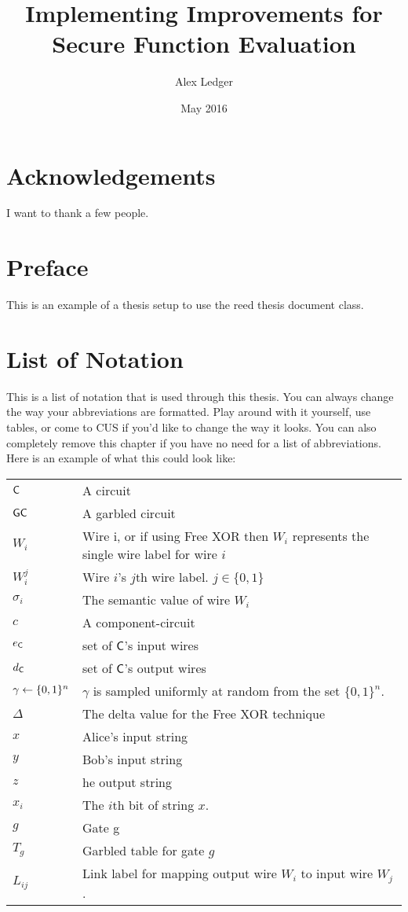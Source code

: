 \documentclass[12pt,twoside]{reedthesis}
\title{Implementing Improvements for Secure Function Evaluation}
\author{Alex Ledger}
\date{May 2016}
\begin{document}
\maketitle
\frontmatter %
\pagestyle{empty} %


\chapter*{Acknowledgements}
I want to thank a few people.

\chapter*{Preface}
This is an example of a thesis setup to use the reed thesis document class.

\chapter*{List of Notation}
This is a list of notation that is used through this thesis.
You can always change the way your abbreviations are formatted. Play around with it yourself, use tables, or come to CUS if you'd like to change the way it looks. You can also completely remove this chapter if you have no need for a list of abbreviations. Here is an example of what this could look like:

\begin{table}[h]
\centering %
\begin{tabular}{ll}
    $\sf {C}$ & A circuit \\
    $\sf {GC}$ & A garbled circuit \\
    $W_i$ & Wire i, or if using Free XOR then $W_i$ represents the single wire label for wire $i$ \\
    $W_i^j$ & Wire $i$'s $j$th wire label. $j \in \{0,1\}$ \\
    $\sigma_i$ & The semantic value of wire $W_i$ \\
    $c$ & A component-circuit \\
    $e_{\sf {C}}$ & set of $\sf {C}$'s input wires \\
    $d_{\sf {C}}$ & set of $\sf {C}$'s output wires \\
    $\gamma \gets \{0,1\}^n$ & $\gamma$ is sampled uniformly at random from the set $\{0,1\}^n$. \\
    $\Delta$ & The delta value for the Free XOR technique \\
    $x$ & Alice's input string \\
    $y$ & Bob's input string \\
    $z$ & he output string \\
    $x_i$ & The $i$th bit of string $x$. \\
    $g$ & Gate g \\
    $T_g$  & Garbled table for gate $g$ \\
    $L_{ij}$ & Link label for mapping output wire $W_i$ to input wire $W_j$. \\
\end{tabular}
\end{table}
	
\end{document}
